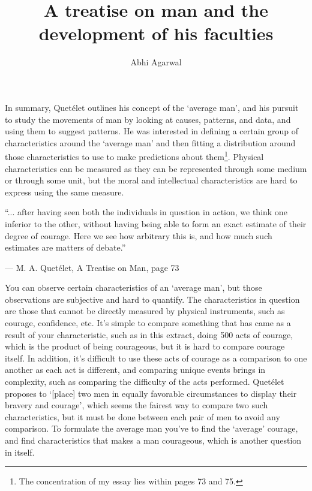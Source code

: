\documentclass[11pt, oneside]{article}
\title{A treatise on man and the development of his faculties}
\author{Abhi Agarwal}
\date{}
\begin{document}
\maketitle

\par In summary, Quet\'{e}let outlines his concept of the `average man', and his pursuit to study the movements of man by looking at causes, patterns, and data, and using them to suggest patterns. He was interested in defining a certain group of characteristics around the `average man' and then fitting a distribution around those characteristics to use to make predictions about them\footnote{The concentration of my essay lies within pages 73 and 75.}. Physical characteristics can be measured as they can be represented through some medium or through some unit, but the moral and intellectual characteristics are hard to express using the same measure. 

\epigraph{``... after having seen both the individuals in question in action, we think one inferior to the other, without having being able to form an exact estimate of their degree of courage. Here we see how arbitrary this is, and how much such estimates are matters of debate.''}{--- \textup{M. A. Quet\'{e}let}, A Treatise on Man, page 73} 

\par You can observe certain characteristics of an `average man', but those observations are subjective and hard to quantify. The characteristics in question are those that cannot be directly measured by physical instruments, such as courage, confidence, etc. It's simple to compare something that has came as a result of your characteristic, such as in this extract, doing 500 acts of courage, which is the product of being courageous, but it is hard to compare courage itself. In addition, it's difficult to use these acts of courage as a comparison to one another as each act is different, and comparing unique events brings in complexity, such as comparing the difficulty of the acts performed. Quet\'{e}let proposes to `[place] two men in equally favorable circumstances to display their bravery and courage', which seems the fairest way to compare two such characteristics, but it must be done between each pair of men to avoid any comparison. To formulate the average man you've to find the `average' courage, and find characteristics  that makes a man courageous, which is another question in itself. 
\end{document}
